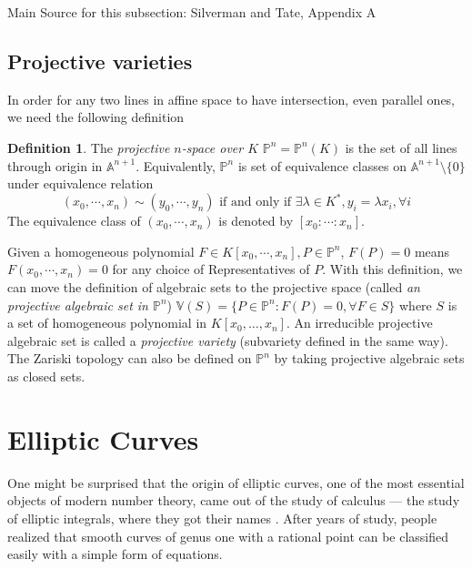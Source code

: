 \documentclass[12pt]{article}
\theoremstyle{remark}
\theoremstyle{definition}
\newtheorem{definition}{Definition}[subsection]
\newcommand{\Pc}{\mathbb{P}}   %
\newcommand{\Ac}{\mathbb{A}}   %
\begin{document}
{        Main Source for this subsection: Silverman and Tate, Appendix A}
        
        
    \subsection{Projective varieties}
        In order for any two lines in affine space to have intersection, even parallel ones, we need the following definition
        \begin{definition}
            The \textit{projective $n$-space over $K$} $\Pc^n = \Pc^n(K)$ is the set of all lines through origin in $\Ac^{n+1}$. Equivalently, $\Pc^n$ is set of equivalence classes on $\Ac^{n+1} \setminus \{0\}$ under equivalence relation 
            $$(x_0, \cdots, x_{n}) \sim (y_0, \cdots, y_{n}) \mbox{ if and only if }\exists \lambda\in K^*, y_i = \lambda x_i,\forall i$$
            The equivalence class of $(x_0, \cdots, x_{n})$ is denoted by $[x_0: \cdots: x_{n}]$.
        \end{definition}
        \noindent Given a homogeneous polynomial $F \in K[x_0, \cdots, x_{n}], P \in \Pc^n$, $F(P) = 0$ means $F(x_0, \cdots, x_{n}) = 0$ for any choice of Representatives of $P$. With this definition, we can move the definition of algebraic sets to the projective space (called \textit{an projective algebraic set in $\Pc^n$}) $\mathbb V(S) = \{P \in \Pc^n :F(P)=0,\forall F \in S\}$ where $S$ is a set of homogeneous polynomial in $K[x_0,\dots, x_n]$. An irreducible projective algebraic set is called a \textit{projective variety} (subvariety defined in the same way). The Zariski topology can also be defined on $\Pc^n$ by taking projective algebraic sets as closed sets.

    
    \section{Elliptic Curves}
        One might be surprised that the origin of elliptic curves, one of the most essential objects of modern number theory, came out of the study of calculus --- the study of elliptic integrals, where they got their names \cite{stevenhagen_1997_kernvak}. After years of study, people realized that smooth curves of genus one with a rational point can be classified easily with a simple form of equations.
\end{document}
